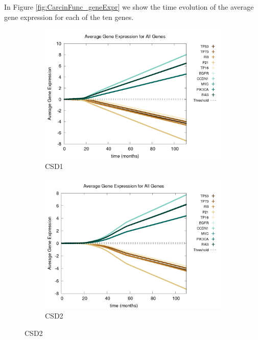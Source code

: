 \documentclass[\main/thesis.tex]{subfiles}
\begin{document}
In Figure \ref{fig:CarcinFunc_geneExpr} we show the time evolution of the average gene expression for each of the ten genes. 
\begin{figure}[H]
	\centering
	\begin{subfigure}[t]{.6\textwidth}
		\centering
		\includegraphics[width=\textwidth]{images/4_CarcinFunc/Fig3/geneExprAll_all_Func1.png}
		\caption{CSD1}
		\label{fig:CarcinFunc_geneExpr_Func1}
	\end{subfigure}
	\begin{subfigure}[t]{.6\textwidth}
		\centering
		\includegraphics[width=\textwidth]{images/4_CarcinFunc/Fig3/geneExprAll_all_Func2.png}
		\caption{CSD2}
		\label{fig:CarcinFunc_geneExpr_Func2}
	\end{subfigure}

\end{figure}
\end{document}
